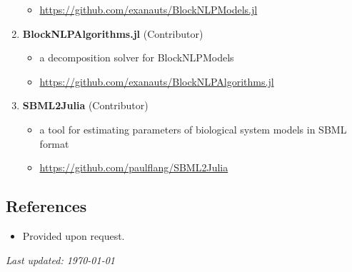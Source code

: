 \documentclass[letterpaper, 11pt]{article}
\begin{document}
\begin{enumerate}[itemsep=0pt]
\begin{itemize}[leftmargin=*,topsep=0pt,label=$\bullet$,topsep=-5pt,itemsep=-1pt]
  \item \url{https://github.com/exanauts/BlockNLPModels.jl}
  \end{itemize}
\item {\bf BlockNLPAlgorithms.jl} (Contributor)
  \begin{itemize}[leftmargin=*,topsep=0pt,label=$\bullet$,topsep=-5pt,itemsep=-1pt]
  \item a decomposition solver for BlockNLPModels
  \item \url{https://github.com/exanauts/BlockNLPAlgorithms.jl}
  \end{itemize}
\item {\bf SBML2Julia} (Contributor)
  \begin{itemize}[leftmargin=*,topsep=0pt,label=$\bullet$,topsep=-5pt,itemsep=-1pt]
  \item a tool for estimating parameters of biological system models in SBML format
  \item \url{https://github.com/paulflang/SBML2Julia}
  \end{itemize}
\end{enumerate}

\subsection*{References}
\begin{itemize}[leftmargin=*]
\item[] Provided upon request.
\end{itemize}

{\noindent\it Last updated: \today}
\end{document}
